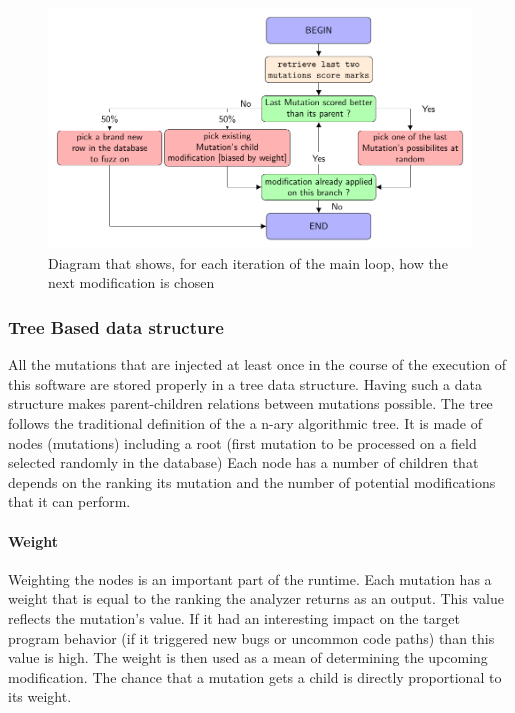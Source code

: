 \documentclass{article}
\begin{document}
\begin{empfile}
				\bigskip
			\begin{figure}[ht!]
			\includegraphics[width=\textwidth]{pickingPaternDiagram.pdf}
			\caption{Diagram that shows, for each iteration of the main loop, how the next modification is chosen}
			\end{figure}			
		
						\bigskip
			\subsubsection{Tree Based data structure}
All the mutations that are injected at least once in the course of the execution of this software are stored properly in a tree data structure. Having such a data structure makes parent-children relations between mutations possible. The tree follows the traditional definition of the a n-ary algorithmic tree.
It is made of nodes (mutations) including a root (first mutation to be processed on a field selected randomly in the database)  
Each node has a number of children that depends on the ranking its mutation and the number of potential modifications that it can perform.
				\paragraph{Weight}
Weighting the nodes is an important part of the runtime. Each mutation has a weight that is equal to the ranking the analyzer returns as an output. This value reflects the mutation's value. If it had an interesting impact on the target program behavior (if it triggered new bugs or uncommon code paths) than this value is high. The weight is then used as a mean of determining the upcoming modification. The chance that a mutation gets a child is directly proportional to its weight.


\end{empfile}
\end{document}
